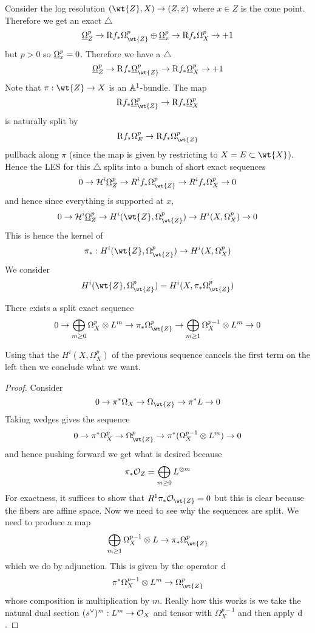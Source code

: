 \documentclass[12pt]{article}
\newcommand{\R}{\mathrm{R}}
\renewcommand{\cH}{\mathcal{H}}
\begin{document}
Consider the log resolution $(\wt{Z}, X) \to (Z, x)$ where $x \in Z$ is the cone point. Therefore we get an exact $\triangle$
\[ \ulO_Z^p \to \R f_* \Omega_{\wt{Z}}^p \oplus \ulO_{x}^p \to \R f_* \Omega_X^p \to +1 \]
but $p > 0$ so $\underline{\Omega}_{x}^p = 0$. Therefore we have a $\triangle$
\[ \ulO_Z^p \to \R f_* \ulO_{\wt{Z}}^p \to \R f_* \ulO_X^p \to + 1 \]
Note that $\pi : \wt{Z} \to X$ is an $\mathbb{A}^1$-bundle. The map
\[ \R f_* \ulO_{\wt{Z}}^p \to \R f_* \ulO_X^p \]
is naturally split by
\[ \R f_* \Omega_E^p \to \R f_* \Omega_{\wt{Z}}^p \]
pullback along $\pi$ (since the map is given by restricting to $X = E \subset \wt{X}$). 
Hence the LES for this $\triangle$ splits into a bunch of short exact sequences
\[ 0 \to \cH^i \ulO_Z^p \to R^i f_* \Omega_{\wt{Z}}^p \to R^i f_* \Omega_{X}^p \to 0 \]
and hence since everything is supported at $x$, 
\[ 0 \to \cH^i \ulO_Z^p \to H^i(\wt{Z}, \Omega_{\wt{Z}}^p) \to H^i(X, \Omega_X^p) \to 0 \]
This is hence the kernel of
\[ \pi_* : H^i(\wt{Z}, \Omega_{\wt{Z}}^p) \to H^i(X, \Omega^p_X) \]
We consider
\[ H^i(\wt{Z}, \Omega_{\wt{Z}}^p) = H^i(X, \pi_* \Omega_{\wt{Z}}^p) \]

\begin{lemma}
There exists a split exact sequence
\[ 0 \to \bigoplus_{m \ge 0} \Omega_X^p \ot L^m \to \pi_* \Omega_{\wt{Z}}^p \to \bigoplus_{m \ge 1} \Omega^{p-1}_X \ot L^m \to 0 \]
\end{lemma}

Using that the $H^i(X, \Omega^p_X)$ of the previous sequence cancels the first term on the left then we conclude what we want. 

\begin{proof}
Consider
\[ 0 \to \pi^* \Omega_X \to \Omega_{\wt{Z}} \to \pi^* L \to 0 \]
Taking wedges gives the sequence
\[ 0 \to \pi^* \Omega_X^p \to \Omega_{\wt{Z}}^p \to \pi^* (\Omega_X^{p-1} \ot L^m) \to 0 \]
and hence pushing forward we get what is desired because
\[ \pi_* \mathcal{O}_{Z} = \bigoplus_{m \ge 0} L^{\otimes m} \]
For exactness, it suffices to show that $R^1 \pi_* \struct{\wt{Z}} = 0$ but this is clear because the fibers are affine space. Now we need to see why the sequences are split. We need to produce a map
\[ \bigoplus_{m \ge 1} \Omega_X^{p-1} \ot L \to \pi_* \Omega_{\wt{Z}}^p \]
which we do by adjunction. This is given by the operator $\mathrm{d}$ 
\[ \pi^* \Omega^{p-1}_X \ot L^m \to \Omega_{\wt{Z}}^p \] 
whose composition is multiplication by $m$. Really how this works is we take the natural dual section $(s^\vee)^m : L^m \to \mathcal{O}_{X}$ and tensor with $\Omega_{X}^{p-1}$ and then apply $\mathrm{d}$. 
\end{proof}
\end{document}
